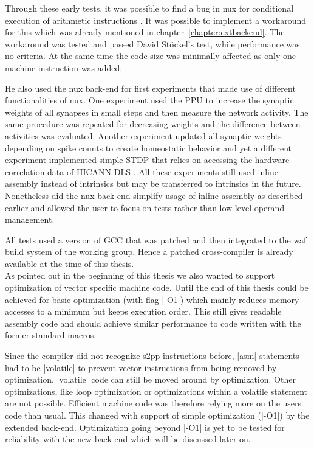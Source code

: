 Through these early tests, it was possible to find a bug in nux for conditional execution of arithmetic instructions \cite{reponux}.
It was possible to implement a workaround for this which was already mentioned in chapter~\ref{chapter:extbackend}.
The workaround was tested and passed David Stöckel's test, while performance was no criteria.
At the same time the code size was minimally affected as only one machine instruction was added.

He also used the nux back-end for first experiments that made use of different functionalities of nux.
One experiment used the \ac{PPU} to increase the synaptic weights of all synapses in small steps and then measure the network activity.
The same procedure was repeated for decreasing weights and the difference between activities was evaluated.
Another experiment updated all synaptic weights depending on spike counts to create homeostatic behavior and yet a different experiment implemented simple \ac{STDP} that relies on accessing the hardware correlation data of \ac{HICANN-DLS} \cite{repostdp}.
All these experiments still used inline assembly instead of intrinsics but may be transferred to intrinsics in the future.
Nonetheless did the nux back-end simplify usage of inline assembly as described earlier and allowed the user to focus on tests rather than low-level operand management.

All tests used a version of \ac{GCC} that was patched and then integrated to the waf build system of the working group.
Hence a patched cross-compiler is already available at the time of this thesis.
\\
As pointed out in the beginning of this thesis we also wanted to support optimization of vector specific machine code.
Until the end of this thesis could be achieved for basic optimization (with flag |-O1|) which mainly reduces memory accesses to a minimum but keeps execution order.
This still gives readable assembly code and should achieve similar performance to code written with the former standard macros.

Since the compiler did not recognize \ac{s2pp} instructions before, |asm| statements had to be |volatile| to prevent vector instructions from being removed by optimization.
|volatile| code can still be moved around by optimization.
Other optimizations, like loop optimization or optimizations within a volatile statement are not possible.
Efficient machine code was therefore relying more on the users code than usual.
This changed with support of simple optimization (|-O1|) by the extended back-end.
Optimization going beyond |-O1| is yet to be tested for reliability with the new back-end which will be discussed later on.

